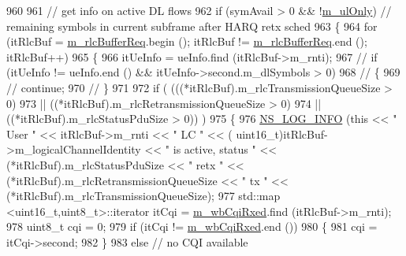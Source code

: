 \begin{DoxyCode}
960 
961         \textcolor{comment}{// get info on active DL flows}
962         \textcolor{keywordflow}{if} (symAvail > 0 && !\hyperlink{classns3_1_1MmWaveFlexTtiMacScheduler_ac9a7f43505a88bb77adc0e3845e42a83}{m\_ulOnly})  \textcolor{comment}{// remaining symbols in current subframe after HARQ retx
       sched}
963         \{
964                 \textcolor{keywordflow}{for} (itRlcBuf = \hyperlink{classns3_1_1MmWaveFlexTtiMacScheduler_a2d166013dff600afe51e8c038c36db2b}{m\_rlcBufferReq}.begin (); itRlcBuf != 
      \hyperlink{classns3_1_1MmWaveFlexTtiMacScheduler_a2d166013dff600afe51e8c038c36db2b}{m\_rlcBufferReq}.end (); itRlcBuf++)
965                 \{
966                         itUeInfo = ueInfo.find (itRlcBuf->m\_rnti);
967                         \textcolor{comment}{//              if (itUeInfo != ueInfo.end () && itUeInfo->second.m\_dlSymbols > 0)}
968                         \textcolor{comment}{//              \{}
969                         \textcolor{comment}{//                      continue;}
970                         \textcolor{comment}{//              \}}
971 
972                         \textcolor{keywordflow}{if} ( (((*itRlcBuf).m\_rlcTransmissionQueueSize > 0)
973                                         || ((*itRlcBuf).m\_rlcRetransmissionQueueSize > 0)
974                                         || ((*itRlcBuf).m\_rlcStatusPduSize > 0)) )
975                         \{
976                                 \hyperlink{group__logging_gafbd73ee2cf9f26b319f49086d8e860fb}{NS\_LOG\_INFO} (\textcolor{keyword}{this} << \textcolor{stringliteral}{" User "} << itRlcBuf->m\_rnti << \textcolor{stringliteral}{" LC "} << (
      uint16\_t)itRlcBuf->m\_logicalChannelIdentity << \textcolor{stringliteral}{" is active, status  "} << (*itRlcBuf).m\_rlcStatusPduSize << \textcolor{stringliteral}{"
       retx "} << (*itRlcBuf).m\_rlcRetransmissionQueueSize << \textcolor{stringliteral}{" tx "} << (*itRlcBuf).m\_rlcTransmissionQueueSize);
977                                 std::map <uint16\_t,uint8\_t>::iterator itCqi = 
      \hyperlink{classns3_1_1MmWaveFlexTtiMacScheduler_ac5f1e12f1e2a6d4e11dbc2baf7c1166a}{m\_wbCqiRxed}.find (itRlcBuf->m\_rnti);
978                                 uint8\_t cqi = 0;
979                                 \textcolor{keywordflow}{if} (itCqi != \hyperlink{classns3_1_1MmWaveFlexTtiMacScheduler_ac5f1e12f1e2a6d4e11dbc2baf7c1166a}{m\_wbCqiRxed}.end ())
980                                 \{
981                                         cqi = itCqi->second;
982                                 \}
983                                 \textcolor{keywordflow}{else} \textcolor{comment}{// no CQI available}

\end{DoxyCode}
